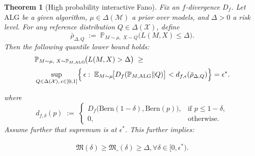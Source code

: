 \documentclass[conference]{IEEEtran}
\newtheorem{theorem}{Theorem}
\begin{document}




\iffalse
\begin{theorem}[High probability interactive Fano]

Fix an $f$-divergence $D_f$. Let $\mathrm{ALG}$ be a given algorithm, $\mu\in\Delta(\mathcal{M})$ a prior over models, and $\Delta>0$ a risk level. For any reference distribution $Q\in\Delta(\mathcal{X})$, define
\[
\bar\rho_{\Delta,Q}\;:=\;\mathbb{P}_{M\sim\mu,\;X\sim Q}\!\bigl(L(M,X)\le \Delta\bigr).
\]
Then the following quantile lower bound holds:
\begin{align*}
&\mathbb{P}_{M\sim\mu,\;X\sim \mathbb{P}_{M,\mathrm{ALG}}}
   \!\bigl(L(M,X)>\Delta\bigr)
   \;\ge\; \\[0.5ex]
   &\sup_{Q\in\Delta(\mathcal{X}),\,\epsilon\in[0,1]}
     \Bigl\{\,\epsilon:\;
       \mathbb{E}_{M\sim\mu}\!\bigl[
         D_f(\mathbb{P}_{M,\mathrm{ALG}}\|Q)
       \bigr]<
       d_{f,\epsilon}(\bar\rho_{\Delta,Q}) 
     \Bigr\} = \epsilon^*.
\end{align*}



where 
\[
d_{f,\delta}(p)\;:=\; 
\begin{cases}
D_f\!\bigl(\mathrm{Bern}(1-\delta),\mathrm{Bern}(p)\bigr), & \text{if } p\le 1-\delta,\\[3pt]
0, & \text{otherwise.}
\end{cases}
\]
Assume further that supremum is at $\epsilon^*$.
This further implies: %

\begin{align*}
\mathfrak{M}(\delta) \geq\mathfrak{M}\_(\delta) \geq \Delta,
 \forall \delta \in [0,\epsilon^*) .
\end{align*}
\end{theorem}
\end{document}
